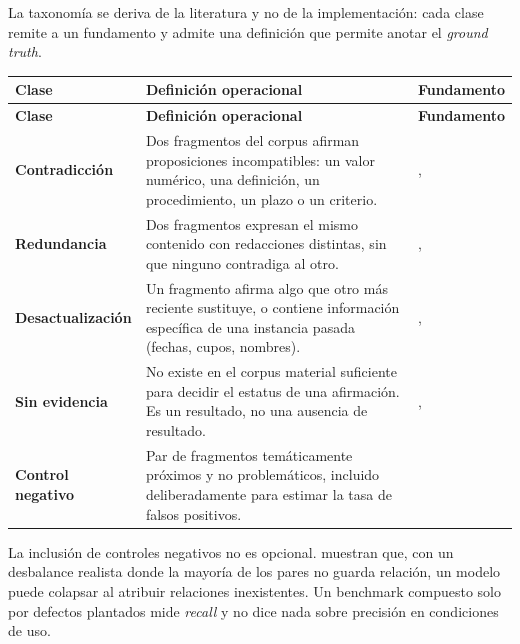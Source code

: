 La taxonomía se deriva de la literatura y no de la implementación: cada clase remite
a un fundamento y admite una definición que permite anotar el \emph{ground truth}.

\begin{xltabular}{\textwidth}{@{}L{3.2cm} X L{3cm}@{}}
\toprule
\textbf{Clase} & \textbf{Definición operacional} & \textbf{Fundamento} \\
\midrule
\endfirsthead
\toprule
\textbf{Clase} & \textbf{Definición operacional} & \textbf{Fundamento} \\
\midrule
\endhead
\bottomrule
\endfoot

\textbf{Contradicción} &
Dos fragmentos del corpus afirman proposiciones incompatibles: un valor numérico, una
definición, un procedimiento, un plazo o un criterio. &
\textcite{koreeda2021contractnli}, \textcite{thorne2018fever} \\

\textbf{Redundancia} &
Dos fragmentos expresan el mismo contenido con redacciones distintas, sin que ninguno
contradiga al otro. &
\textcite{gao2024retrieval}, \textcite{reimers2019sentencebert} \\

\textbf{Desactualización} &
Un fragmento afirma algo que otro más reciente sustituye, o contiene información
específica de una instancia pasada (fechas, cupos, nombres). &
\textcite{leacock2007framework}, \textcite{gao2024retrieval} \\

\textbf{Sin evidencia} &
No existe en el corpus material suficiente para decidir el estatus de una afirmación.
Es un resultado, no una ausencia de resultado. &
\textcite{thorne2018fever}, \textcite{gubelmann2024capturing} \\

\textbf{Control negativo} &
Par de fragmentos temáticamente próximos y no problemáticos, incluido
deliberadamente para estimar la tasa de falsos positivos. &
\textcite{gubelmann2024capturing} \\
\end{xltabular}

\begin{advertencia}
La inclusión de controles negativos no es opcional.
\textcite{gubelmann2024capturing} muestran que, con un desbalance realista donde la
mayoría de los pares no guarda relación, un modelo puede colapsar al atribuir
relaciones inexistentes. Un benchmark compuesto solo por defectos plantados mide
\emph{recall} y no dice nada sobre precisión en condiciones de uso.
\end{advertencia}

